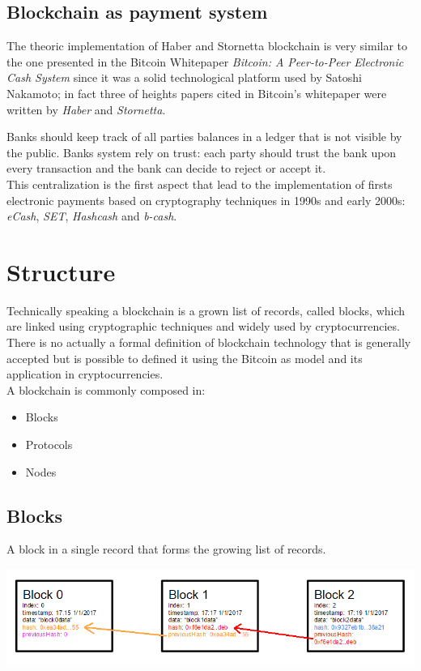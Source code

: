 \subsection{Blockchain as payment system}

The theoric implementation of Haber and Stornetta blockchain is very similar to the one presented in the Bitcoin Whitepaper \textit{Bitcoin: A Peer-to-Peer Electronic Cash System}\cite{bitcoin} since it was a solid technological platform used by Satoshi Nakamoto; in fact three of heights papers cited in Bitcoin's whitepaper were written by \textit{Haber} and \textit{Stornetta}.

Banks should keep track of all parties balances in a ledger that is not visible by the public. Banks system rely on trust: each party should trust the bank upon every transaction and the bank can decide to reject or accept it.\\
This centralization is the first aspect that lead to the implementation of firsts electronic payments based on cryptography techniques in 1990s and early 2000s: \textit{eCash}, \textit{SET}, \textit{Hashcash} and \textit{b-cash}.


\section{Structure}

Technically speaking a blockchain is a grown list of records, called blocks, which are linked using cryptographic techniques and widely used by cryptocurrencies.\\
There is no actually a formal definition of blockchain technology that is generally accepted but is possible to defined it using the Bitcoin as model and its application in cryptocurrencies.\\

A blockchain is commonly composed in:
\begin{itemize}
    \item Blocks
    \item Protocols
    \item Nodes
\end{itemize}

\subsection{Blocks}

A block in a single record that forms the growing list of records.

\includegraphics[scale=0.45]{images/blockchain_basic.png}

